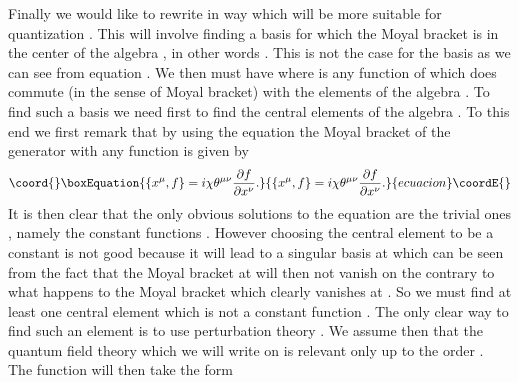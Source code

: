 \documentclass[a4paper,12pt]{article}
\begin{document}
Finally we would like to rewrite \coordHE{} in way which will be
more suitable for quantization . This will involve finding a basis
\coordHE{} for which  the Moyal bracket \coordHE{}
is in the center of the algebra \coordHE{} , in other words
\coordHE{} . This is not the case for
the basis \coordHE{} as we can see from equation \coordHE{} . We then
must have \coordHE{}
where \coordHE{} is any function of \coordHE{} which does commute (in
the sense of Moyal bracket) with the elements of the algebra
\coordHE{} . To find such a basis we need first to find the
central elements \coordHE{} of the algebra \coordHE{} . To
this end we first remark that by using the equation \coordHE{} the
Moyal bracket of the generator \coordHE{} with any function \coordHE{}
is given by
\begin{equation}\coord{}\boxEquation{
\{x^{\mu},f\}=i{\chi}{\theta}^{{\mu}{\nu}}\frac{\partial{f}}{\partial{x^{\nu}}}.
}{
\{x^{\mu},f\}=i{\chi}{\theta}^{{\mu}{\nu}}\frac{\partial{f}}{\partial{x^{\nu}}}.
}{ecuacion}\coordE{}\end{equation}
It is then clear that the only obvious solutions to the equation
\coordHE{} are the trivial ones , namely the constant
functions . However choosing the central element \coordHE{} to
be a constant is not good because it will lead to a singular
basis at \coordHE{} which can be seen from the fact that the
Moyal bracket \coordHE{} at \coordHE{} will then not
vanish on the contrary to what happens to the Moyal bracket
\coordHE{} which clearly vanishes at \coordHE{} . So we must find at
least one central element which is not a constant function . The
only clear way to find such an element is to use perturbation
theory . We assume then that the quantum field theory which we
will write on \coordHE{} is relevant only up to the \coordHE{} order
. The function \coordHE{} will then take the form
\end{document}
